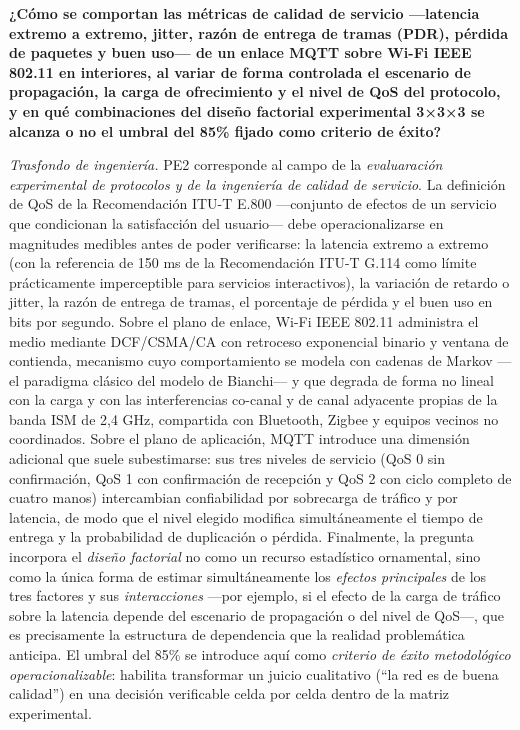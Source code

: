 \documentclass[
  12pt,
]{article}
\begin{document}
\textbf{¿Cómo se comportan las métricas de calidad de servicio —latencia
extremo a extremo, jitter, razón de entrega de tramas (PDR), pérdida de
paquetes y buen uso— de un enlace MQTT sobre Wi-Fi IEEE 802.11 en
interiores, al variar de forma controlada el escenario de propagación,
la carga de ofrecimiento y el nivel de QoS del protocolo, y en qué
combinaciones del diseño factorial experimental 3×3×3 se alcanza o no el
umbral del 85\% fijado como criterio de éxito?}

\emph{Trasfondo de ingeniería.} PE2 corresponde al campo de la
\emph{evaluaración experimental de protocolos y de la ingeniería de
calidad de servicio}. La definición de QoS de la Recomendación ITU-T
E.800 —conjunto de efectos de un servicio que condicionan la
satisfacción del usuario— debe operacionalizarse en magnitudes medibles
antes de poder verificarse: la latencia extremo a extremo (con la
referencia de 150 ms de la Recomendación ITU-T G.114 como límite
prácticamente imperceptible para servicios interactivos), la variación
de retardo o jitter, la razón de entrega de tramas, el porcentaje de
pérdida y el buen uso en bits por segundo. Sobre el plano de enlace,
Wi-Fi IEEE 802.11 administra el medio mediante DCF/CSMA/CA con retroceso
exponencial binario y ventana de contienda, mecanismo cuyo
comportamiento se modela con cadenas de Markov —el paradigma clásico del
modelo de Bianchi— y que degrada de forma no lineal con la carga y con
las interferencias co-canal y de canal adyacente propias de la banda ISM
de 2,4 GHz, compartida con Bluetooth, Zigbee y equipos vecinos no
coordinados. Sobre el plano de aplicación, MQTT introduce una dimensión
adicional que suele subestimarse: sus tres niveles de servicio (QoS 0
sin confirmación, QoS 1 con confirmación de recepción y QoS 2 con ciclo
completo de cuatro manos) intercambian confiabilidad por sobrecarga de
tráfico y por latencia, de modo que el nivel elegido modifica
simultáneamente el tiempo de entrega y la probabilidad de duplicación o
pérdida. Finalmente, la pregunta incorpora el \emph{diseño factorial} no
como un recurso estadístico ornamental, sino como la única forma de
estimar simultáneamente los \emph{efectos principales} de los tres
factores y sus \emph{interacciones} —por ejemplo, si el efecto de la
carga de tráfico sobre la latencia depende del escenario de propagación
o del nivel de QoS—, que es precisamente la estructura de dependencia
que la realidad problemática anticipa. El umbral del 85\% se introduce
aquí como \emph{criterio de éxito metodológico operacionalizable}:
habilita transformar un juicio cualitativo (“la red es de buena
calidad”) en una decisión verificable celda por celda dentro de la
matriz experimental.
\end{document}
